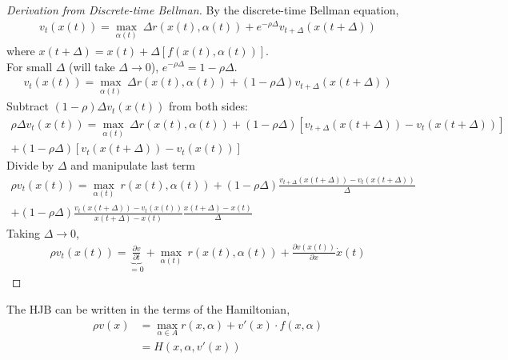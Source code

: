 \documentclass[11pt]{elegantbook}
\begin{document}
\begin{proof}[Derivation from Discrete-time Bellman]
    By the discrete-time Bellman equation,
    \begin{equation}
        \begin{aligned}
            v_t(x(t))=\max_{\alpha(t)}\ \Delta r(x(t),\alpha(t)) + e^{-\rho\Delta}v_{t+\Delta}(x(t+\Delta))
        \end{aligned}
        \nonumber
    \end{equation}
    where $x(t+\Delta)=x(t)+\Delta [f(x(t),\alpha(t))]$.\\
    For small $\Delta$ (will take $\Delta \rightarrow 0$), $e^{-\rho\Delta}=1-\rho\Delta$.
    \begin{equation}
        \begin{aligned}
            v_t(x(t))=\max_{\alpha(t)}\ \Delta r(x(t),\alpha(t)) + (1-\rho\Delta)v_{t+\Delta}(x(t+\Delta))
        \end{aligned}
        \nonumber
    \end{equation}
    Subtract $(1-\rho)\Delta v_t(x(t))$ from both sides:
    \begin{equation}
        \begin{aligned}
            \rho \Delta v_t(x(t))=\max_{\alpha(t)}\ \Delta r(x(t),\alpha(t)) + (1-\rho\Delta)[v_{t+\Delta}(x(t+\Delta))-v_{t}(x(t+\Delta))]\\
            +(1-\rho\Delta)[v_{t}(x(t+\Delta))-v_t(x(t))]
        \end{aligned}
        \nonumber
    \end{equation}
    Divide by $\Delta$ and manipulate last term
    \begin{equation}
        \begin{aligned}
            \rho v_t(x(t))=\max_{\alpha(t)}\ r(x(t),\alpha(t)) + (1-\rho\Delta)\frac{v_{t+\Delta}(x(t+\Delta))-v_t(x(t+\Delta))}{\Delta}\\
            + (1-\rho\Delta)\frac{v_t(x(t+\Delta))-v_t(x(t))}{x(t+\Delta)-x(t)}\frac{x(t+\Delta)-x(t)}{\Delta}
        \end{aligned}
        \nonumber
    \end{equation}
    Taking $\Delta \rightarrow 0$,
    \begin{equation}
        \begin{aligned}
            \rho v_t(x(t)) = \underbrace{\frac{\partial v}{\partial t}}_{=0} + \max_{\alpha(t)}\ r(x(t),\alpha(t)) + \frac{\partial v(x(t))}{\partial x}\dot{x}(t)
        \end{aligned}
        \nonumber
    \end{equation}
\end{proof}
\begin{note}
    The HJB can be written in the terms of the Hamiltonian,
    \begin{equation}
        \begin{aligned}
            \rho v(x) &= \max_{\alpha\in A} r(x,\alpha) + v'(x)\cdot f(x,\alpha)\\
            & = H(x,\alpha,v'(x))
        \end{aligned}
        \nonumber
    \end{equation}
\end{note}
\end{document}

